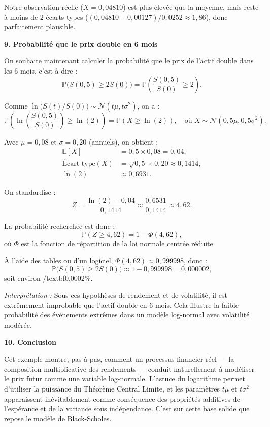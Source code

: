 \begin{examplebox}
Notre observation réelle (\( X = 0{,}04810 \)) est plus élevée que la moyenne, mais reste à moins de 2 écarts-types (\( (0{,}04810 - 0{,}00127)/0{,}0252 \approx 1{,}86 \)), donc parfaitement plausible.

\medskip
\noindent \textbf{9. Probabilité que le prix double en 6 mois}

On souhaite maintenant calculer la probabilité que le prix de l’actif double dans les 6 mois, c’est-à-dire :
\[
\mathbb{P}\big(S(0{,}5) \geq 2 S(0)\big) = \mathbb{P}\left( \frac{S(0{,}5)}{S(0)} \geq 2 \right).
\]

Comme \( \ln\big(S(t)/S(0)\big) \sim \mathcal{N}(t\mu, t\sigma^2) \), on a :
\[
\mathbb{P}\left( \ln\left(\frac{S(0{,}5)}{S(0)}\right) \geq \ln(2) \right)
= \mathbb{P}\left( X \geq \ln(2) \right),
\quad \text{où } X \sim \mathcal{N}(0{,}5\mu, 0{,}5\sigma^2).
\]

Avec \( \mu = 0{,}08 \) et \( \sigma = 0{,}20 \) (annuels), on obtient :
\[
\begin{aligned}
\mathbb{E}[X] &= 0{,}5 \times 0{,}08 = 0{,}04, \\
\text{Écart-type}(X) &= \sqrt{0{,}5} \times 0{,}20 \approx 0{,}1414, \\
\ln(2) &\approx 0{,}6931.
\end{aligned}
\]

On standardise :
\[
Z = \frac{\ln(2) - 0{,}04}{0{,}1414} \approx \frac{0{,}6531}{0{,}1414} \approx 4{,}62.
\]

La probabilité recherchée est donc :
\[
\mathbb{P}(Z \geq 4{,}62) = 1 - \Phi(4{,}62),
\]
où \( \Phi \) est la fonction de répartition de la loi normale centrée réduite.

À l’aide des tables ou d’un logiciel, \( \Phi(4{,}62) \approx 0{,}999998 \), donc :
\[
\mathbb{P}\big(S(0{,}5) \geq 2 S(0)\big) \approx 1 - 0{,}999998 = 0{,}000002,
\]
soit environ /textbf{0,0002\%}.

\textit{Interprétation :} Sous ces hypothèses de rendement et de volatilité, il est extrêmement improbable que l’actif double en 6 mois. Cela illustre la faible probabilité des événements extrêmes dans un modèle log-normal avec volatilité modérée.

\medskip
\noindent \textbf{10. Conclusion}

Cet exemple montre, pas à pas, comment un processus financier réel — la composition multiplicative des rendements — conduit naturellement à modéliser le prix futur comme une variable log-normale. L’astuce du logarithme permet d’utiliser la puissance du Théorème Central Limite, et les paramètres \( t\mu \) et \( t\sigma^2 \) apparaissent inévitablement comme conséquence des propriétés additives de l’espérance et de la variance sous indépendance. C’est sur cette base solide que repose le modèle de Black-Scholes.
\end{examplebox}